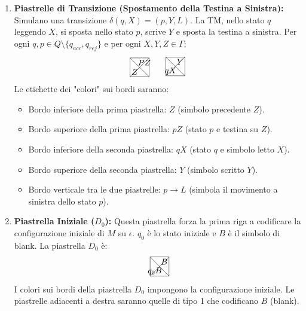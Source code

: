 \documentclass[a4paper]{article}
\begin{document}
\begin{enumerate}
    \item \textbf{Piastrelle di Transizione (Spostamento della Testina a Sinistra):}
    Simulano una transizione $\delta(q, X) = (p, Y, L)$. La TM, nello stato $q$ leggendo $X$, si sposta nello stato $p$, scrive $Y$ e sposta la testina a sinistra.
    Per ogni $q, p \in Q \setminus \{q_{acc}, q_{rej}\}$ e per ogni $X, Y, Z \in \Gamma$:
    \[
    \begin{tikzpicture}[scale=0.8]
    \draw (0,0) -- (1,0) -- (1,1) -- (0,1) -- cycle;
    \draw (0,0) -- (1,1);
    \draw (1,0) -- (0,1);
    \node at (0.25, 0.75) {}; %
    \node at (0.75, 0.75) {$PZ$}; %
    \node at (0.25, 0.25) {$Z$}; %
    \node at (0.75, 0.25) {}; %
    \end{tikzpicture}
    \quad
    \begin{tikzpicture}[scale=0.8]
    \draw (0,0) -- (1,0) -- (1,1) -- (0,1) -- cycle;
    \draw (0,0) -- (1,1);
    \draw (1,0) -- (0,1);
    \node at (0.25, 0.75) {}; %
    \node at (0.75, 0.75) {$Y$}; %
    \node at (0.25, 0.25) {$qX$}; %
    \node at (0.75, 0.25) {}; %
    \end{tikzpicture}
    \]
    Le etichette dei "colori" sui bordi saranno:
    \begin{itemize}
        \item Bordo inferiore della prima piastrella: $Z$ (simbolo precedente $Z$).
        \item Bordo superiore della prima piastrella: $pZ$ (stato $p$ e testina su $Z$).
        \item Bordo inferiore della seconda piastrella: $qX$ (stato $q$ e simbolo letto $X$).
        \item Bordo superiore della seconda piastrella: $Y$ (simbolo scritto $Y$).
        \item Bordo verticale tra le due piastrelle: $p \to L$ (simbola il movimento a sinistra dello stato $p$).
    \end{itemize}

    \item \textbf{Piastrella Iniziale ($D_0$):}
    Questa piastrella forza la prima riga a codificare la configurazione iniziale di $M$ su $\epsilon$. $q_0$ è lo stato iniziale e $B$ è il simbolo di blank.
    La piastrella $D_0$ è:
    \[
    \begin{tikzpicture}[scale=0.8]
    \draw (0,0) -- (1,0) -- (1,1) -- (0,1) -- cycle;
    \draw (0,0) -- (1,1);
    \draw (1,0) -- (0,1);
    \node at (0.25, 0.75) {}; %
    \node at (0.75, 0.75) {$B$}; %
    \node at (0.25, 0.25) {$q_0B$}; %
    \node at (0.75, 0.25) {}; %
    \end{tikzpicture}
    \]
    I colori sui bordi della piastrella $D_0$ impongono la configurazione iniziale. Le piastrelle adiacenti a destra saranno quelle di tipo 1 che codificano $B$ (blank).
\end{enumerate}
\end{document}

